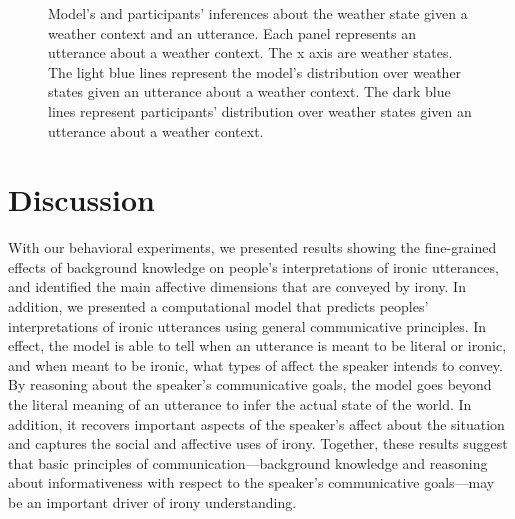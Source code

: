 \documentclass[10pt,letterpaper]{article}
\begin{document}
\begin{figure}[t]
\caption{Model's and participants' inferences about the weather state given a weather context and an utterance. Each panel represents an utterance about a weather context. The x axis are weather states. The light blue lines represent the model's distribution over weather states given an utterance about a weather context. The dark blue lines represent participants' distribution over weather states given an utterance about a weather context.}
\label{model-state}
\end{figure}

\section{Discussion}
With our behavioral experiments, we presented results showing the fine-grained effects of background knowledge on people's interpretations of ironic utterances, and identified the main affective dimensions that are conveyed by irony. In addition, we presented a computational model that predicts peoples' interpretations of ironic utterances using general communicative principles. In effect, the model is able to tell when an utterance is meant to be literal or ironic, and when meant to be ironic, what types of affect the speaker intends to convey. By reasoning about the speaker's communicative goals, the model goes beyond the literal meaning of an utterance to infer the actual state of the world. In addition, it recovers important aspects of the speaker's affect about the situation and captures the social and affective uses of irony. Together, these results suggest that basic principles of communication---background knowledge and reasoning about informativeness with respect to the speaker's communicative goals---may be an important driver of irony understanding.
\end{document}
